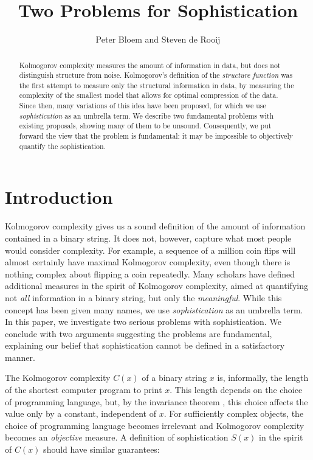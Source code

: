 \documentclass{style/llncs}
\title{Two Problems for Sophistication}
\author{Peter Bloem and Steven de Rooij}
\institute{
  System and Network Engineering Group, \\University of Amsterdam, the Netherlands\\
  \email{uva@peterbloem.nl, steven.de.rooij@gmail.com}
}
\begin{document}
 
\maketitle

\begin{abstract}
Kolmogorov complexity measures the amount of information in data, but does not distinguish structure from noise. Kolmogorov's definition of the \emph{structure function} was the first attempt to measure only the structural information in data, by measuring the complexity of the smallest model that allows for optimal compression of the data. Since then, many variations of this idea have been proposed, for which we use \emph{sophistication} as an umbrella term. We describe two fundamental problems with existing proposals, showing many of them to be unsound. Consequently, we put forward the view that the problem is fundamental: it may be impossible to objectively quantify the sophistication.
\end{abstract}

\section{Introduction}
\enlargethispage{2\baselineskip}

Kolmogorov complexity gives us a sound definition of the amount of information contained in a binary string. It does not, however, capture what most people would consider complexity. For example, a sequence of a million coin flips will almost certainly have maximal Kolmogorov complexity, even though there is nothing complex about flipping a coin repeatedly. Many scholars have defined additional measures in the spirit of Kolmogorov complexity, aimed at quantifying not \emph{all} information in a binary string, but only the \emph{meaningful}. While this concept has been given many names, we use \emph{sophistication} as an umbrella term. In this paper, we investigate two serious problems with sophistication. We conclude with two arguments suggesting the problems are fundamental, explaining our belief that sophistication cannot be defined in a satisfactory manner.

The Kolmogorov complexity $C(x)$ of a binary string $x$ is, informally, the length of the shortest computer program to print $x$. This length depends on the choice of programming language, but, by the invariance theorem \cite[Section~2.1]{li1993introduction}, this choice affects the value only by a constant, independent of $x$. For sufficiently complex objects, the choice of programming language becomes irrelevant and Kolmogorov complexity becomes an \emph{objective} measure. A definition of sophistication $S(x)$ in the spirit of $C(x)$ should have similar guarantees:
\end{document}
